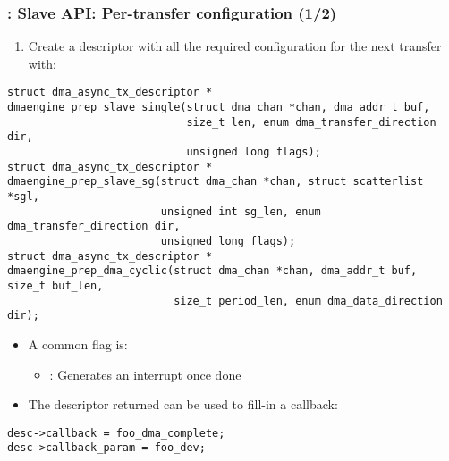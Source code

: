 \begin{frame}[fragile]
  \frametitle{: Slave API: Per-transfer configuration (1/2)}
  \begin{enumerate}
  \item Create a descriptor with all the required configuration for the
    next transfer with:
  \end{enumerate}
\begin{verbatim}
struct dma_async_tx_descriptor *
dmaengine_prep_slave_single(struct dma_chan *chan, dma_addr_t buf,
                            size_t len, enum dma_transfer_direction dir,
                            unsigned long flags);
struct dma_async_tx_descriptor *
dmaengine_prep_slave_sg(struct dma_chan *chan, struct scatterlist *sgl,
                        unsigned int sg_len, enum dma_transfer_direction dir,
                        unsigned long flags);
struct dma_async_tx_descriptor *
dmaengine_prep_dma_cyclic(struct dma_chan *chan, dma_addr_t buf, size_t buf_len,
                          size_t period_len, enum dma_data_direction dir);
\end{verbatim}
  \begin{itemize}
  \item A common flag is:
    \begin{itemize}
    \item {}: Generates an interrupt once done
    \end{itemize}
  \item The descriptor returned can be used to fill-in a callback:
  \end{itemize}
\begin{verbatim}
desc->callback = foo_dma_complete;
desc->callback_param = foo_dev;
\end{verbatim}
\end{frame}

